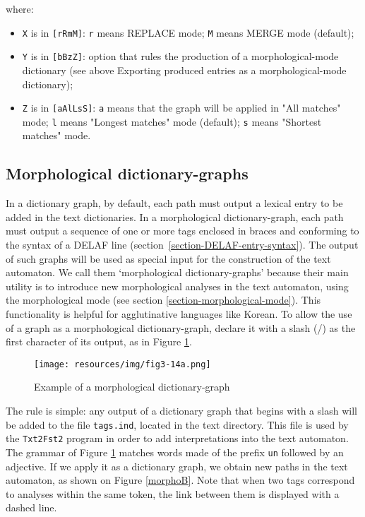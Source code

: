 \noindent where:
\begin{itemize}
\item \verb+X+ is in \verb+[rRmM]+: \verb+r+ means REPLACE mode; \verb+M+ means MERGE mode (default);
\item \verb+Y+ is in \verb+[bBzZ]+: option that rules the production of a morphological-mode dictionary (see above Exporting produced entries as a morphological-mode dictionary);
\item \verb+Z+ is in \verb+[aAlLsS]+: \verb+a+ means that the graph will be applied in "All matches" mode; \verb+l+ means 
      "Longest matches" mode (default); \verb+s+ means "Shortest matches" mode.
\end{itemize}



\subsection{Morphological dictionary-graphs}
\label{section-morphological-dictionary-graphs}
In a dictionary graph, by default, each path must output a lexical entry to be added in the text
dictionaries. In a morphological dictionary-graph, each path must output
a sequence of one or more tags enclosed in braces and conforming to the syntax
of a DELAF line (section~\ref{section-DELAF-entry-syntax}). The output
of such graphs will be used as special input for the construction of the text
automaton. We call them `morphological dictionary-graphs' because their
main utility is to introduce new morphological analyses in the text automaton,
using the morphological mode (see section \ref{section-morphological-mode}).
This functionality is helpful for agglutinative languages like Korean. To allow the use of a
graph as a morphological dictionary-graph, declare it with a slash (/) as the first
character of its output, as in Figure \ref{morphoA}.


\begin{figure}[!ht]
\begin{center}
\texttt{[image: resources/img/fig3-14a.png]}
\caption{Example of a morphological dictionary-graph\label{morphoA}}
\end{center}
\end{figure}

\noindent The rule is simple: any output of a dictionary graph that begins
with a slash will be added to the file \verb+tags.ind+, 
located in the text directory. This file is used by the \verb+Txt2Fst2+ program
in order to add interpretations into the text automaton. The
grammar of Figure \ref{morphoA} matches words made of the prefix
\verb+un+ followed by an adjective. If we apply it as a dictionary
graph, we obtain new paths in the text automaton, as shown on Figure
\ref{morphoB}. Note that when two tags correspond to analyses within the same
token, the link between them is displayed with a dashed line.

